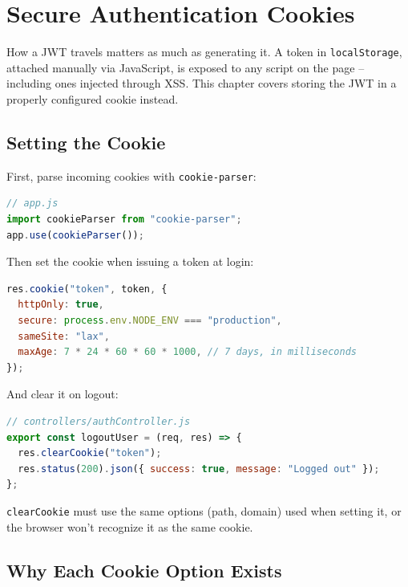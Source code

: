 \chapter{Secure Authentication Cookies}

How a JWT travels matters as much as generating it. A token in \texttt{localStorage}, attached manually via JavaScript, is exposed to any script on the page -- including ones injected through XSS. This chapter covers storing the JWT in a properly configured cookie instead.

\section{Setting the Cookie}

First, parse incoming cookies with \texttt{cookie-parser}:

\begin{lstlisting}[language=JavaScript]
// app.js
import cookieParser from "cookie-parser";
app.use(cookieParser());
\end{lstlisting}

Then set the cookie when issuing a token at login:

\begin{lstlisting}[language=JavaScript]
res.cookie("token", token, {
  httpOnly: true,
  secure: process.env.NODE_ENV === "production",
  sameSite: "lax",
  maxAge: 7 * 24 * 60 * 60 * 1000, // 7 days, in milliseconds
});
\end{lstlisting}

And clear it on logout:

\begin{lstlisting}[language=JavaScript]
// controllers/authController.js
export const logoutUser = (req, res) => {
  res.clearCookie("token");
  res.status(200).json({ success: true, message: "Logged out" });
};
\end{lstlisting}

\begin{warnbox}[WARNING]
\texttt{clearCookie} must use the same options (path, domain) used when setting it, or the browser won't recognize it as the same cookie.
\end{warnbox}

\section{Why Each Cookie Option Exists}


